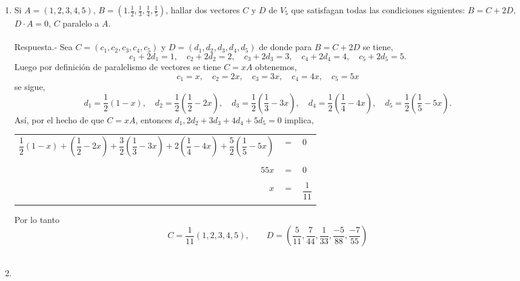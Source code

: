 \begin{enumerate}[\bfseries 1.]
 \item Si $A=(1,2,3,4,5)$, $B=(1.\frac{1}{2},\frac{1}{3},\frac{1}{4},\frac{1}{5})$, hallar dos vectores $C$ y $D$ de $V_5$ que satisfagan todas las condiciones siguientes: $B=C+2D,$ $D\cdot A=0$, $C$ paralelo a $A$.\\\\
     Respuesta.-\; Sea $C=(c_1,c_2,c_3,c_4,c_5)$ y $D=(d_1,d_2,d_3,d_4,d_5)$ de donde para $B=C+2D$ se tiene, $$c_1+2d_1=1, \quad c_2+2d_2=2, \quad c_3+2d_3=3, \quad c_4+2d_4=4, \quad c_5+2d_5=5.$$
     Luego por definición de paralelismo de vectores se tiene  $C=xA$ obtenemos,
     $$c_1=x,\quad c_2=2x, \quad c_3=3x, \quad c_4=4x,\quad c_5=5x$$
     se sigue, $$d_1=\dfrac{1}{2} (1-x), \quad d_2=\dfrac{1}{2}\left(\dfrac{1}{2}-2x\right) , \quad d_3 =\dfrac{1}{2}\left(\dfrac{1}{3}-3x\right),\quad d_4=\dfrac{1}{2}\left(\dfrac{1}{4}-4x\right),\quad d_5=\dfrac{1}{2}\left(\dfrac{1}{5}-5x\right).$$
     Así, por el hecho de que $C=xA$, entonces $d_1,2d_2+3d_3+4d_4+5d_5=0$  implica,
     \begin{center}
	 \begin{tabular}{rcl}
	     $\dfrac{1}{2}(1-x)+\left(\dfrac{1}{2}-2x\right)+\dfrac{3}{2}\left(\dfrac{1}{3}-3x\right)+2\left(\dfrac{1}{4}-4x\right)+\dfrac{5}{2}\left(\dfrac{1}{5}-5x\right)$&$=$&$0$\\\\
	     $55x$&$=$&$0$\\\\
	     $x$&$=$&$\dfrac{1}{11}$\\\\
	 \end{tabular}
     \end{center}

     Por lo tanto $$C=\dfrac{1}{11}(1,2,3,4,5), \qquad D=\left(\dfrac{5}{11},\dfrac{7}{44},\dfrac{1}{33},\dfrac{-5}{88},\dfrac{-7}{55}\right)$$\\

\item 
\end{enumerate}
